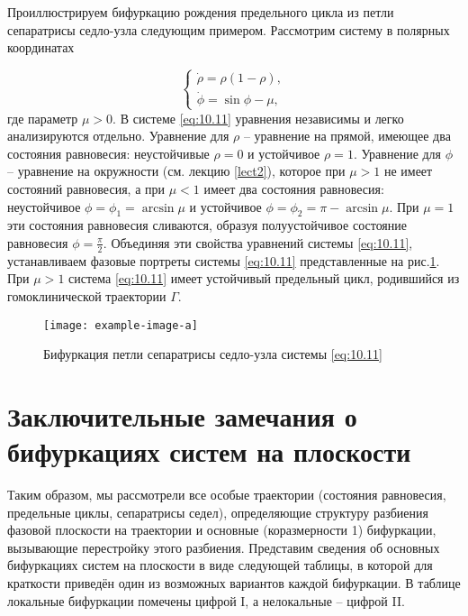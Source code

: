 Проиллюстрируем бифуркацию рождения предельного цикла из петли
сепаратрисы седло-узла следующим примером. Рассмотрим систему в
полярных координатах

\begin{equation}
        \label{eq:10.11}
        \begin{cases}
                \dot \rho = \rho(1-\rho),\\
                \dot \phi = \sin \phi - \mu,
        \end{cases}
\end{equation}
где параметр $\mu>0$. В системе \eqref{eq:10.11} уравнения независимы и легко
анализируются отдельно. Уравнение для $\rho$ -- уравнение на прямой, имеющее
два состояния равновесия: неустойчивые $\rho=0$ и устойчивое $\rho=1$. 
Уравнение для $\phi$ -- уравнение  на окружности (см. лекцию \ref{lect2}), которое
при $\mu>1$ не имеет состояний равновесия, а при $\mu<1$ имеет два состояния равновесия:
неустойчивое $\phi=\phi_{1}=\arcsin \mu$ и устойчивое $\phi = \phi_{2} = \pi - \arcsin \mu$.
При $\mu =1$ эти состояния равновесия сливаются, образуя полуустойчивое состояние равновесия $\phi= \frac{\pi}{2}$. Объединяя эти свойства уравнений системы \eqref{eq:10.11}, устанавливаем фазовые портреты системы
\eqref{eq:10.11} представленные на рис.\ref{fig:10.3}. При $\mu>1$ система \eqref{eq:10.11} имеет устойчивый предельный цикл,
родившийся из гомоклинической траектории $\Gamma$.

\begin{figure}[h]
        \centering
        \texttt{[image: example-image-a]}
        \caption{Бифуркация петли сепаратрисы седло-узла системы \eqref{eq:10.11}}
        \label{fig:10.3}
\end{figure}

\section{Заключительные замечания о бифуркациях систем на плоскости}%
\label{sec:10.2}

Таким образом, мы рассмотрели все особые траектории (состояния
равновесия, предельные циклы, сепаратрисы седел), определяющие структуру
разбиения фазовой плоскости на траектории и основные (коразмерности 1)
бифуркации, вызывающие перестройку этого разбиения. Представим сведения
об основных бифуркациях систем на плоскости в виде следующей таблицы, в
которой для краткости приведён один из возможных вариантов каждой
бифуркации. В таблице локальные бифуркации помечены цифрой I, а
нелокальные – цифрой II.

